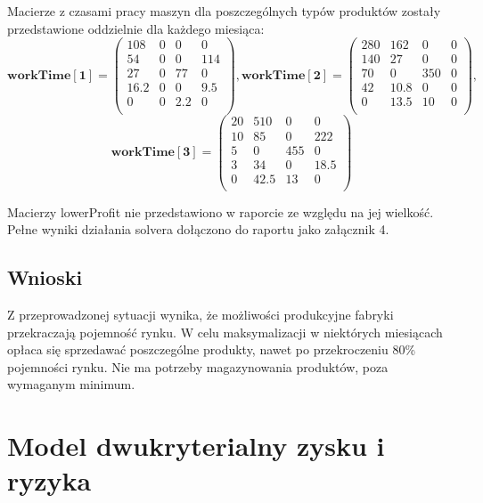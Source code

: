\documentclass[11pt,a4paper]{article}
\begin{document}
Macierze z czasami pracy maszyn dla poszczególnych typów produktów zostały przedstawione oddzielnie dla każdego miesiąca:
\begin{displaymath}
 \mathbf{workTime[1]} =
 \begin{pmatrix}
  108 & 0 & 0 & 0 \\
  54 & 0 & 0 & 114 \\ 
  27 & 0 & 77 & 0 \\
  16.2 & 0 & 0 & 9.5 \\
  0 & 0 & 2.2 & 0 \\  
 \end{pmatrix},
 \mathbf{workTime[2]} =
 \begin{pmatrix}
  280 & 162 & 0 & 0 \\
  140 & 27 & 0 & 0 \\ 
  70 & 0 & 350 & 0 \\
  42 & 10.8 & 0 & 0 \\ 
  0 & 13.5 & 10 & 0 \\
 \end{pmatrix},
\end{displaymath}
\begin{displaymath}
 \mathbf{workTime[3]} =
 \begin{pmatrix}
  20 & 510 & 0 & 0 \\
  10 & 85 & 0 & 222 \\ 
  5 & 0 & 455 & 0 \\
  3 & 34 & 0 & 18.5 \\ 
  0 & 42.5 & 13 & 0 \\
 \end{pmatrix}
\end{displaymath}

Macierzy lowerProfit nie przedstawiono w raporcie ze względu na jej wielkość. Pełne wyniki działania solvera dołączono do raportu jako załącznik 4.
\subsection{Wnioski}
Z przeprowadzonej sytuacji wynika, że możliwości produkcyjne fabryki przekraczają pojemność rynku. W celu maksymalizacji w niektórych miesiącach opłaca się sprzedawać poszczególne produkty, nawet po przekroczeniu 80\% pojemności rynku. Nie ma potrzeby magazynowania produktów, poza wymaganym minimum.

\section{Model dwukryterialny zysku i ryzyka}
\end{document}
